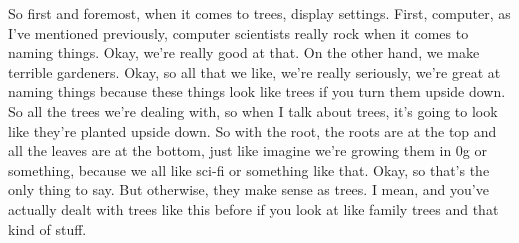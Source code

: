 So first and foremost, when it comes to trees, display settings. First, computer, as I've mentioned previously, computer scientists really rock when it comes to naming things. Okay, we're really good at that. On the other hand, we make terrible gardeners. Okay, so all that we like, we're really seriously, we're great at naming things because these things look like trees if you turn them upside down. So all the trees we're dealing with, so when I talk about trees, it's going to look like they're planted upside down. So with the root, the roots are at the top and all the leaves are at the bottom, just like imagine we're growing them in 0g or something, because we all like sci-fi or something like that. Okay, so that's the only thing to say. But otherwise, they make sense as trees. I mean, and you've actually dealt with trees like this before if you look at like family trees and that kind of stuff.

